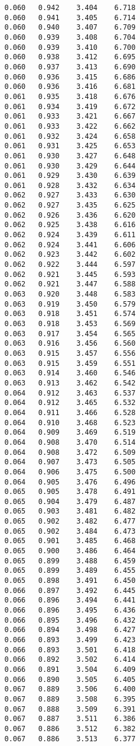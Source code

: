 \begin{verbatim}
   0.060   0.942    3.404    6.718
   0.060   0.941    3.405    6.714
   0.060   0.940    3.407    6.709
   0.060   0.939    3.408    6.704
   0.060   0.939    3.410    6.700
   0.060   0.938    3.412    6.695
   0.060   0.937    3.413    6.690
   0.060   0.936    3.415    6.686
   0.060   0.936    3.416    6.681
   0.061   0.935    3.418    6.676
   0.061   0.934    3.419    6.672
   0.061   0.933    3.421    6.667
   0.061   0.933    3.422    6.662
   0.061   0.932    3.424    6.658
   0.061   0.931    3.425    6.653
   0.061   0.930    3.427    6.648
   0.061   0.930    3.429    6.644
   0.061   0.929    3.430    6.639
   0.061   0.928    3.432    6.634
   0.062   0.927    3.433    6.630
   0.062   0.927    3.435    6.625
   0.062   0.926    3.436    6.620
   0.062   0.925    3.438    6.616
   0.062   0.924    3.439    6.611
   0.062   0.924    3.441    6.606
   0.062   0.923    3.442    6.602
   0.062   0.922    3.444    6.597
   0.062   0.921    3.445    6.593
   0.062   0.921    3.447    6.588
   0.063   0.920    3.448    6.583
   0.063   0.919    3.450    6.579
   0.063   0.918    3.451    6.574
   0.063   0.918    3.453    6.569
   0.063   0.917    3.454    6.565
   0.063   0.916    3.456    6.560
   0.063   0.915    3.457    6.556
   0.063   0.915    3.459    6.551
   0.063   0.914    3.460    6.546
   0.063   0.913    3.462    6.542
   0.064   0.912    3.463    6.537
   0.064   0.912    3.465    6.532
   0.064   0.911    3.466    6.528
   0.064   0.910    3.468    6.523
   0.064   0.909    3.469    6.519
   0.064   0.908    3.470    6.514
   0.064   0.908    3.472    6.509
   0.064   0.907    3.473    6.505
   0.064   0.906    3.475    6.500
   0.064   0.905    3.476    6.496
   0.065   0.905    3.478    6.491
   0.065   0.904    3.479    6.487
   0.065   0.903    3.481    6.482
   0.065   0.902    3.482    6.477
   0.065   0.902    3.484    6.473
   0.065   0.901    3.485    6.468
   0.065   0.900    3.486    6.464
   0.065   0.899    3.488    6.459
   0.065   0.899    3.489    6.455
   0.065   0.898    3.491    6.450
   0.066   0.897    3.492    6.445
   0.066   0.896    3.494    6.441
   0.066   0.896    3.495    6.436
   0.066   0.895    3.496    6.432
   0.066   0.894    3.498    6.427
   0.066   0.893    3.499    6.423
   0.066   0.893    3.501    6.418
   0.066   0.892    3.502    6.414
   0.066   0.891    3.504    6.409
   0.066   0.890    3.505    6.405
   0.067   0.889    3.506    6.400
   0.067   0.889    3.508    6.395
   0.067   0.888    3.509    6.391
   0.067   0.887    3.511    6.386
   0.067   0.886    3.512    6.382
   0.067   0.886    3.513    6.377

\end{verbatim}

